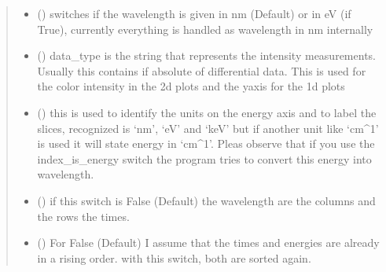 \documentclass[letterpaper,10pt,english]{sphinxmanual}
\begin{document}
\begin{fulllineitems}
\begin{fulllineitems}
\begin{quote}
\begin{description}
\begin{itemize}
\item {} 
 (\sphinxstyleliteralemphasis{\sphinxupquote{ (}}\sphinxstyleliteralemphasis{\sphinxupquote{)}}) \textendash{} switches if the wavelength is given in nm (Default) or in eV (if True), currently everything
is handled as wavelength in nm internally

\item {} 
 (\sphinxstyleliteralemphasis{\sphinxupquote{ (}}\sphinxstyleliteralemphasis{\sphinxupquote{)}}) \textendash{} data\_type is the string that represents the intensity measurements. Usually this contains if absolute
of differential data. This is used for the color intensity in the 2d plots and the y\sphinxhyphen{}axis for the 1d plots

\item {} 
 (\sphinxstyleliteralemphasis{\sphinxupquote{ (}}\sphinxstyleliteralemphasis{\sphinxupquote{)}}) \textendash{} this is used to identify the units on the energy axis and to label the slices, recognized is ‘nm’, ‘eV’ and ‘keV’
but if another unit like ‘cm\textasciicircum{}\sphinxhyphen{}1’ is used it will state energy in ‘cm\textasciicircum{}\sphinxhyphen{}1’. Pleas observe that if you use the index\_is\_energy
switch the program tries to convert this energy into wavelength.

\item {} 
 (\sphinxstyleliteralemphasis{\sphinxupquote{ (}}\sphinxstyleliteralemphasis{\sphinxupquote{)}}) \textendash{} if this switch is False (Default) the wavelength are the columns and the rows the times.

\item {} 
 (\sphinxstyleliteralemphasis{\sphinxupquote{ (}}\sphinxstyleliteralemphasis{\sphinxupquote{)}}) \textendash{} For False (Default) I assume that the times and energies are already in a rising order.
with this switch, both are sorted again.


\end{itemize}
\end{description}
\end{quote}
\end{fulllineitems}
\end{fulllineitems}
\end{document}
